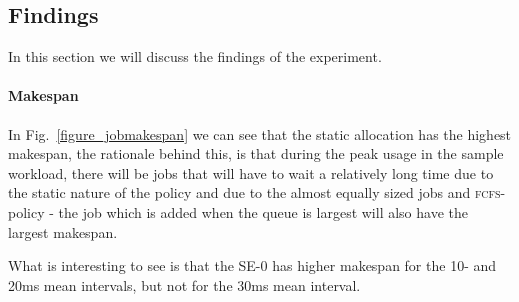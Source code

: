 

\subsection{Findings}
In this section we will discuss the findings of the experiment.

\paragraph{Makespan}
In Fig.~\ref{figure_jobmakespan} we can see that the static allocation
has the highest makespan, the rationale behind this, is that during
the peak usage in the sample workload, there will be jobs that will
have to wait a relatively long time due to the static nature of the
policy and due to the almost equally sized jobs and
\textsc{fcfs}-policy - the job which is added when the queue is largest
will also have the largest makespan.

What is interesting to see is that the SE-0 has higher makespan for
the 10- and 20ms mean intervals, but not for the 30ms mean interval.









